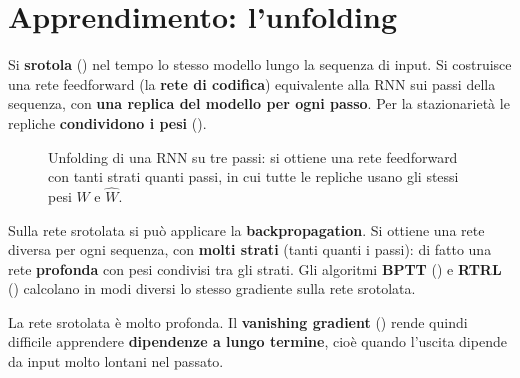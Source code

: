 \section{Apprendimento: l'unfolding}

Si \textbf{srotola} () nel tempo lo stesso modello lungo la sequenza di input. Si costruisce una rete
feedforward (la \textbf{rete di codifica}) equivalente alla RNN sui passi della sequenza, con \textbf{una replica
del modello per ogni passo}. Per la stazionarietà le repliche \textbf{condividono i pesi} ().

\begin{figure}[ht]
\centering
{}
\caption{Unfolding di una RNN su tre passi: si ottiene una rete feedforward con tanti strati quanti passi, in cui tutte
le repliche usano gli stessi pesi $W$ e $\hat W$.}
\label{fig:unfolding}
\end{figure}

\begin{idea}
Sulla rete srotolata si può applicare la \textbf{backpropagation}. Si ottiene una rete diversa per ogni sequenza,
con \textbf{molti strati} (tanti quanti i passi): di fatto una rete \textbf{profonda} con pesi condivisi tra gli
strati. Gli algoritmi \textbf{BPTT} () e \textbf{RTRL} () calcolano in modi diversi lo stesso gradiente sulla rete srotolata.
\end{idea}

\begin{attenzione}
La rete srotolata è molto profonda. Il \textbf{vanishing gradient} () rende quindi difficile
apprendere \textbf{dipendenze a lungo termine}, cioè quando l'uscita dipende da input molto lontani nel passato.
\end{attenzione}

